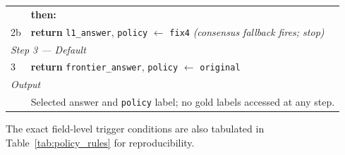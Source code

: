 \begin{table}[t]
\begin{tabular}{p{} p{}}
   & \textbf{then:} \\
2b & \quad \textbf{return} \texttt{l1\_answer}, \texttt{policy} $\leftarrow$ \texttt{fix4} \quad\quad \textit{(consensus fallback fires; stop)} \\
\midrule
\multicolumn{2}{l}{\textit{Step 3 --- Default}} \\
3  & \textbf{return} \texttt{frontier\_answer}, \texttt{policy} $\leftarrow$ \texttt{original} \\
\midrule
\multicolumn{2}{l}{\textit{Output}} \\
& Selected answer and \texttt{policy} label; no gold labels accessed at any step. \\
\bottomrule
\end{tabular}
\end{table}

The exact field-level trigger conditions are also tabulated in
Table~\ref{tab:policy_rules} for reproducibility.
